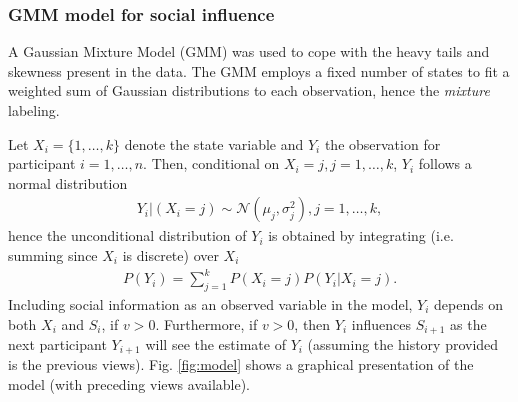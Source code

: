 \documentclass[9pt,a4paper,twocolumn,lineno]{article}
\begin{document}
%

\subsubsection*{GMM model for social influence}
A Gaussian Mixture Model (GMM) was used to cope with the heavy tails and skewness present in the data. The GMM employs a fixed number of states to fit a weighted sum of Gaussian distributions to each observation, hence the \emph{mixture} labeling.

Let $X_i=\{1,\dots,k\}$ denote the state variable and $Y_i$ the observation for participant $i=1,\dots,n$. Then, conditional on $X_i=j, j=1,\dots,k$, $Y_i$ follows a normal distribution
\begin{align*}
	Y_i|(X_i=j)  \sim \mathcal{N} (\mu_j,\sigma^2_j), j=1,\dots,k,
\end{align*}
hence the unconditional distribution of $Y_i$ is obtained by integrating (i.e. summing since $X_i$ is discrete) over $X_i$
\begin{align*}
	P(Y_i) = \sum_{j=1}^k P(X_i=j)P(Y_i|X_i=j).
\end{align*}
Including social information as an observed variable in the model, $Y_i$ depends on both $X_i$ and $S_i$, if $v>0$. Furthermore, if $v>0$, then $Y_i$ influences $S_{i+1}$ as the next participant $Y_{i+1}$ will see the estimate of $Y_i$ (assuming the history provided is the previous views). Fig. \ref{fig:model} shows a graphical presentation of the model (with preceding views available).
\end{document}

